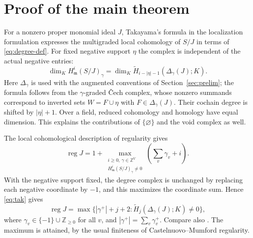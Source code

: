 \documentclass[11pt,a4paper]{article}
\theoremstyle{definition}
\newcommand{\reg}{\operatorname{reg}}
\newcommand{\Ht}{\widetilde H}
\newcommand{\ZZ}{\mathbb Z}
\newcommand{\NN}{\mathbb Z_{\geq 0}}
\newcommand{\m}{\mathfrak m}
\begin{document}
\section{Proof of the main theorem}\label{sec:proof}
For a nonzero proper monomial ideal $J$, Takayama's formula \cite{Tak} in the localization formulation \cite[Section 1]{MT} expresses the multigraded local cohomology of $S/J$ in terms of \eqref{eq:degree-def}. For fixed negative support $\eta$ the complex is independent of the actual negative entries:
\begin{equation}\label{eq:tak}
 \dim_K H^i_{\m}(S/J)_\gamma=
 \dim_K\Ht_{i-|\eta|-1}(\Delta_\gamma(J);K).
\end{equation}
Here $\Delta_\gamma$ is used with the augmented conventions of Section~\ref{sec:prelim}; the formula follows from the $\gamma$-graded \v{C}ech complex, whose nonzero summands correspond to inverted sets $W=F\cup\eta$ with $F\in\Delta_\gamma(J)$. Their cochain degree is shifted by $|\eta|+1$. Over a field, reduced cohomology and homology have equal dimension. This explains the contributions of $\{\varnothing\}$ and the void complex as well.

The local cohomological description of regularity gives
\begin{equation}\label{eq:reglocal}
 \reg J=1+\max_{\substack{i\geq0,\ \gamma\in\ZZ^V\\ H^i_{\m}(S/J)_\gamma\ne0}}\left(\sum_v\gamma_v+i\right).
\end{equation}
With the negative support fixed, the degree complex is unchanged by replacing each negative coordinate by $-1$, and this maximizes the coordinate sum. Hence \eqref{eq:tak} gives
\begin{equation}\label{eq:reg}
 \reg J=\max\bigl\{|\gamma^+|+j+2:
 \Ht_j(\Delta_\gamma(J);K)\ne0\bigr\},
\end{equation}
where $\gamma_v\in\{-1\}\cup\NN$ for all $v$, and $|\gamma^+|=\sum_v\gamma_v^+$. Compare also \cite[Lemmas 2.9 and 2.11]{MV}. The maximum is attained, by the usual finiteness of Castelnuovo--Mumford regularity.
\end{document}
